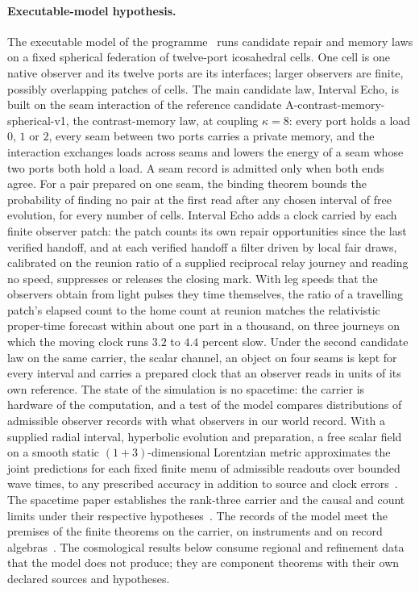 \paragraph{Executable-model hypothesis.}
The executable model of the programme~\cite{ophmodel} runs candidate repair
and memory laws on a fixed spherical federation of twelve-port icosahedral
cells. One cell is one native observer and its twelve ports are its
interfaces; larger observers are finite, possibly overlapping patches of
cells. The main candidate law, Interval Echo, is built on the seam
interaction of the reference candidate A-contrast-memory-spherical-v1, the
contrast-memory law, at coupling $\kappa=8$: every port holds a load $0$,
$1$ or $2$, every seam between two ports carries a private memory, and the
interaction exchanges loads across seams and lowers the energy of a seam
whose two ports both hold a load. A seam record is admitted only when both
ends agree. For a pair prepared on one seam, the binding theorem bounds
the probability of finding no pair at the first read after any chosen
interval of free evolution, for every number of cells. Interval Echo adds a clock carried by each finite observer patch: the
patch counts its own repair opportunities since the last verified handoff,
and at each verified handoff a filter driven by local fair draws, calibrated on the reunion ratio of a
supplied reciprocal relay journey and reading no speed, suppresses or
releases the closing mark. With leg speeds that the observers obtain from
light pulses they time themselves, the ratio of a travelling patch's elapsed
count to the home count at reunion matches the relativistic proper-time
forecast within about one part in a thousand, on three journeys on which the
moving clock runs $3.2$ to $4.4$ percent slow. Under the second candidate law
on the same carrier, the scalar channel, an object on four seams is kept for
every interval and carries a prepared clock that an observer reads in units
of its own reference. The state of
the simulation is no spacetime: the carrier is hardware of the computation,
and a test of the model compares distributions of admissible observer records
with what observers in our world record. With a supplied radial interval, hyperbolic evolution
and preparation, a free scalar field on a smooth static $(1+3)$-dimensional
Lorentzian metric approximates the joint predictions for each fixed finite
menu of admissible readouts over bounded wave times, to any prescribed
accuracy in addition to source and clock errors~\cite{ophsynthesis,ophEinstein}.
The spacetime paper establishes the rank-three carrier and the causal and
count limits under their respective hypotheses~\cite{ophEinstein}. The records of the model meet the premises of the
finite theorems on the carrier, on instruments and on record
algebras~\cite{ophmodel}. The cosmological results below consume regional
and refinement data that the model does not produce; they are component
theorems with their own declared sources and hypotheses.
